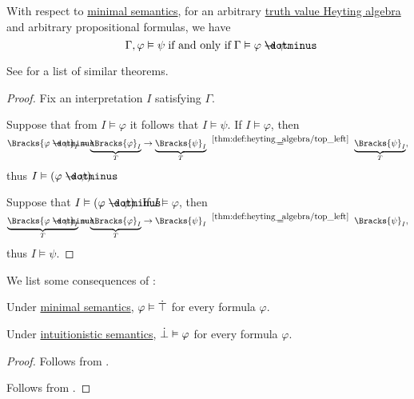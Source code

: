 \begin{theorem}\label{thm:propositional_semantic_deduction_theorem}
  With respect to \hyperref[def:minimal_propositional_semantics]{minimal semantics}, for an arbitrary \hyperref[def:truth_value_algebra]{truth value Heyting algebra} and arbitrary propositional formulas, we have
  \begin{equation*}
    \Gamma, \varphi \vDash \psi \T{if and only if} \Gamma \vDash \varphi \synimplies \psi.
  \end{equation*}
\end{theorem}
\begin{comments}
  \item See  for a list of similar theorems.
\end{comments}
\begin{proof}
  Fix an interpretation \( I \) satisfying \( \Gamma \).

  \SufficiencySubProof Suppose that from \( I \vDash \varphi \) it follows that \( I \vDash \psi \). If \( I \vDash \varphi \), then
  \begin{equation*}
    \Bracks{\varphi \synimplies \psi}_I
    =
    \underbrace{\Bracks{\varphi}_I}_T \rightarrow \underbrace{\Bracks{\psi}_I}_T
    \reloset {\ref{thm:def:heyting_algebra/top_left}} =
    \underbrace{\Bracks{\psi}_I}_T,
  \end{equation*}
  thus \( I \vDash (\varphi \synimplies \psi) \).

  \NecessitySubProof Suppose that \( I \vDash (\varphi \synimplies \psi) \). If \( I \vDash \varphi \), then
  \begin{equation*}
    \underbrace{\Bracks{\varphi \synimplies \psi}_I}_{T}
    =
    \underbrace{\Bracks{\varphi}_I}_T \rightarrow \Bracks{\psi}_I
    \reloset {\ref{thm:def:heyting_algebra/top_left}} =
    \Bracks{\psi}_I,
  \end{equation*}
  thus \( I \vDash \psi \).
\end{proof}

\begin{corollary}\label{thm:intuitionistic_deduction_consequences}
  We list some consequences of :
  \begin{thmenum}
     Under \hyperref[def:minimal_propositional_semantics]{minimal semantics}, \( \varphi \vDash \dot\top \) for every formula \( \varphi \).

     Under \hyperref[def:propositional_semantics]{intuitionistic semantics}, \( \dot\bot \vDash \varphi \) for every formula \( \varphi \).
  \end{thmenum}
\end{corollary}
\begin{proof}
   Follows from .

   Follows from .
\end{proof}

